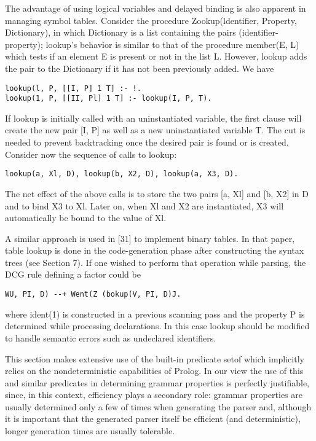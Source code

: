 The advantage of using logical variables and delayed binding is also
apparent in managing symbol tables. Consider the procedure Zookup(ldentifier,
Property, Dictionary), in which Dictionary is a list containing the pairs
(identifier-property); lookup’s behavior is similar to that of the procedure
member(E, L) which tests if an element E is present or not in the list L. However,
lookup adds the pair to the Dictionary if it has not been previously added. We
have
\begin{verbatim}
lookup(l, P, [[I, P] 1 T] :- !.
lookup(1, P, [[II, Pl] 1 T] :- lookup(I, P, T).
\end{verbatim}
If lookup is initially called with an uninstantiated variable, the first clause will
create the new pair [I, P] as well as a new uninstantiated variable T. The cut is
needed to prevent backtracking once the desired pair is found or is created. 
Consider now the sequence of calls to lookup:
\begin{verbatim}
lookup(a, Xl, D), lookup(b, X2, D), lookup(a, X3, D). 
\end{verbatim}

The net effect of the above calls is to store the two pairs [a, Xl] and [b, X2] in
D and to bind X3 to Xl. Later on, when Xl and X2 are instantiated, X3 will
automatically be bound to the value of Xl. 

A similar approach is used in [31] to implement binary tables. In that paper,
table lookup is done in the code-generation phase after constructing the syntax
trees (see Section 7). If one wished to perform that operation while parsing, the
DCG rule defining a factor could be
\begin{verbatim}
WU, PI, D) --+ Went(Z (bokup(V, PI, D)J. 
\end{verbatim}
where ident(1) is constructed in a previous scanning pass and the property P is
determined while processing declarations. In this case lookup should be modified
to handle semantic errors such as undeclared identifiers. 

\label{cohen5}

This section makes extensive use of the built-in predicate setof which implicitly
relies on the nondeterministic capabilities of Prolog. In our view the use of this
and similar predicates in determining grammar properties is perfectly justifiable,
since, in this context, efficiency plays a secondary role: grammar properties are 
usually determined only a few of times when generating the parser and, although
it is important that the generated parser itself be efficient (and deterministic),
longer generation times are usually tolerable. 

